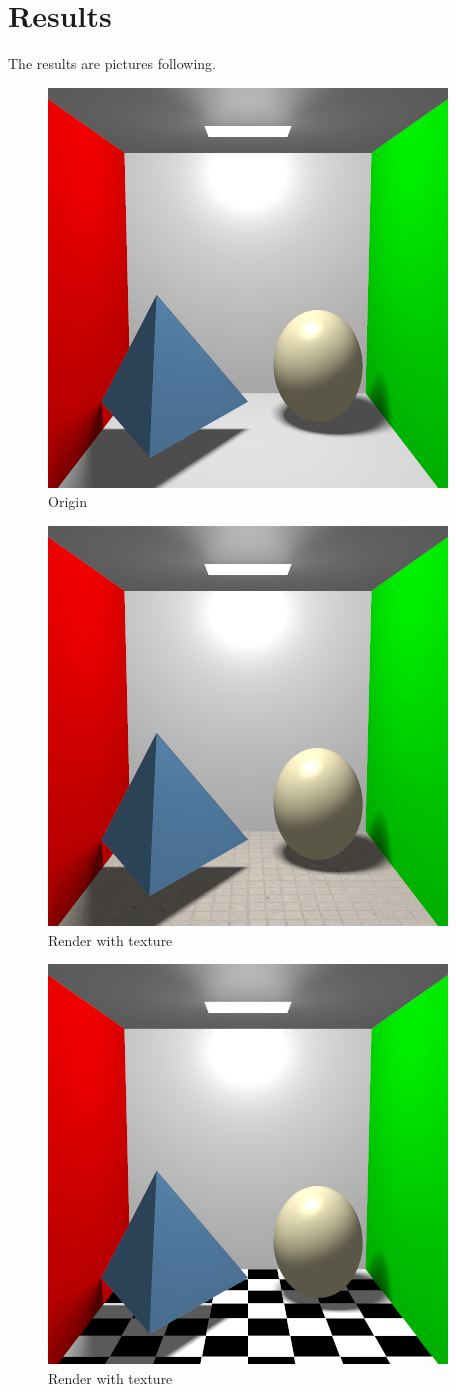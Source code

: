 \documentclass[acmtog]{acmart}
\begin{document}
\section{Results}
The results are pictures following.\\

\begin{figure}[h]
	\centering
	\includegraphics[width=0.7\linewidth]{result_8_5}
	\caption{Origin}
	\label{fig:Origin}
\end{figure}
\begin{figure}[h]
	\centering
	\includegraphics[width=0.7\linewidth]{texture_diff_8_5.png}
	\caption{Render with texture}
	\label{fig:Origin}
\end{figure}
\begin{figure}[h]
	\centering
	\includegraphics[width=0.7\linewidth]{texture_grid_8_5.png}
	\caption{Render with texture}
	\label{fig:Origin}
\end{figure}
\end{document}
